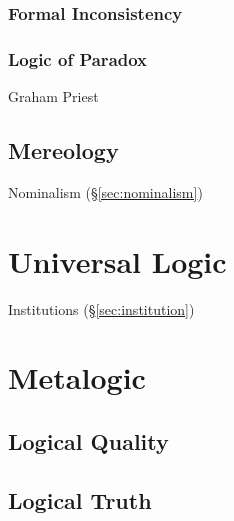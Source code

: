 \subsubsection{Formal Inconsistency}\label{sec:formal_inconsistency}

\subsubsection{Logic of Paradox}\label{sec:logic_of_paradox}

Graham Priest



\subsection{Mereology}\label{sec:mereology}

Nominalism (\S\ref{sec:nominalism})



\section{Universal Logic}\label{sec:universal_logic}

Institutions (\S\ref{sec:institution})



\section{Metalogic}\label{sec:metalogic}

\subsection{Logical Quality}\label{sec:logical_quality}

\subsection{Logical Truth}\label{sec:logical_truth}

